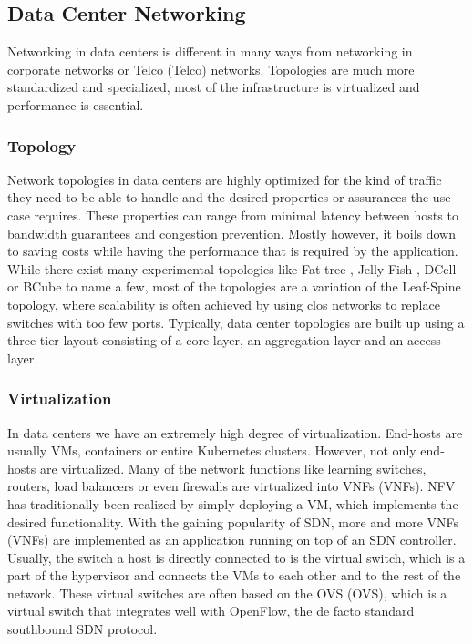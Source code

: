\subsection{Data Center Networking}\label{Data Center Networking}
Networking in data centers is different in many ways from networking in corporate networks or \acs{Telco} (\acl{Telco}) networks. Topologies are much more standardized and specialized, most of the infrastructure is virtualized and performance is essential.

\subsubsection{Topology}
Network topologies in data centers are highly optimized for the kind of traffic they need to be able to handle and the desired properties or assurances the use case requires. These properties can range from minimal latency between hosts to bandwidth guarantees and congestion prevention. Mostly however, it boils down to saving costs while having the performance that is required by the application. While there exist many experimental topologies like Fat-tree \cite{LeisersonFatTree}, Jelly Fish \cite{singla2012jellyfish}, DCell \cite{guo2008dcell} or BCube \cite{guo2009bcube} to name a few, most of the topologies are a variation of the Leaf-Spine topology, where scalability is often achieved by using clos networks to replace switches with too few ports. Typically, data center topologies are built up using a three-tier layout consisting of a core layer, an aggregation layer and an access layer.
\subsubsection{Virtualization}
In data centers we have an extremely high degree of virtualization. End-hosts are usually \acsp{VM}, containers or entire Kubernetes clusters. However, not only end-hosts are virtualized. Many of the network functions like learning switches, routers, load balancers or even firewalls are virtualized into \acsp{VNF} (\aclp{VNF}). \acl{NFV} has traditionally been realized by simply deploying a \acs{VM}, which implements the desired functionality. With the gaining popularity of \acs{SDN}, more and more \acsp{VNF} (\aclp{VNF}) are implemented as an application running on top of an \acs{SDN} controller. Usually, the switch a host is directly connected to is the virtual switch, which is a part of the hypervisor and connects the VMs to each other and to the rest of the network. These virtual switches are often based on the \acs{OVS} (\acl{OVS}), which is a virtual switch that integrates well with OpenFlow, the de facto standard southbound \acs{SDN} protocol.

